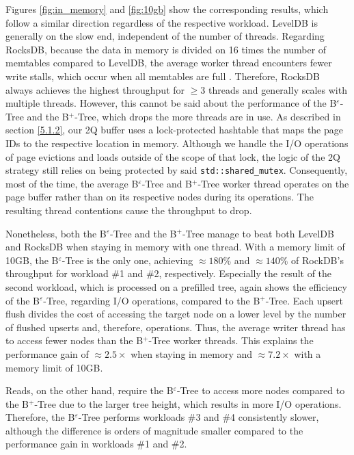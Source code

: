 Figures \ref{fig:in_memory} and \ref{fig:10gb} show the corresponding results, which follow a similar direction regardless of the respective workload. LevelDB is generally on the slow end, independent of the number of threads. Regarding RocksDB, because the data in memory is divided on 16 times the number of memtables compared to LevelDB, the average worker thread encounters fewer write stalls, which occur when all memtables are full \cite{write_stalls}. Therefore, RocksDB always achieves the highest throughput for $\geq 3$ threads and generally scales with multiple threads.\newline
However, this cannot be said about the performance of the B$^\varepsilon$-Tree and the B$^+$-Tree, which drops the more threads are in use. As described in section \ref{5.1.2}, our 2Q buffer uses a lock-protected hashtable that maps the page IDs to the respective location in memory. Although we handle the I/O operations of page evictions and loads outside of the scope of that lock, the logic of the 2Q strategy still relies on being protected by said \texttt{std::shared\_mutex}. Consequently, most of the time, the average B$^\varepsilon$-Tree and B$^+$-Tree worker thread operates on the page buffer rather than on its respective nodes during its operations. The resulting thread contentions cause the throughput to drop.

Nonetheless, both the B$^\varepsilon$-Tree and the B$^+$-Tree manage to beat both LevelDB and RocksDB when staying in memory with one thread. With a memory limit of 10GB, the B$^\varepsilon$-Tree is the only one, achieving $\approx 180\%$ and $\approx 140\%$ of RockDB's throughput for workload \#1 and \#2, respectively. Especially the result of the second workload, which is processed on a prefilled tree, again shows the efficiency of the B$^\varepsilon$-Tree, regarding I/O operations, compared to the B$^+$-Tree. Each upsert flush divides the cost of accessing the target node on a lower level by the number of flushed upserts and, therefore, operations. Thus, the average writer thread has to access fewer nodes than the B$^+$-Tree worker threads. This explains the performance gain of $\approx 2.5\times$ when staying in memory and $\approx 7.2\times$ with a memory limit of 10GB.

Reads, on the other hand, require the B$^\varepsilon$-Tree to access more nodes compared to the B$^+$-Tree due to the larger tree height, which results in more I/O operations. Therefore, the B$^\varepsilon$-Tree performs workloads \#3 and \#4 consistently slower, although the difference is orders of magnitude smaller compared to the performance gain in workloads \#1 and \#2.

